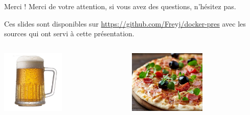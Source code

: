 
\begin{frame}{Merci !}
    Merci de votre attention, si vous avez des questions, n'hésitez pas.
    
    Ces slides sont disponibles sur \href{https://github.com/Freyj/docker-pres}{https://github.com/Freyj/docker-pres} 
    avec les sources qui ont servi à cette présentation.
    
    \begin{columns}
        \begin{column}{0.5\textwidth}
            \includegraphics[height=3cm]{img/biere.jpg}
        \end{column}
        \begin{column}{0.5\textwidth}
            \includegraphics[height=3cm]{img/pizza.jpg}
        \end{column}
    \end{columns}
\end{frame}